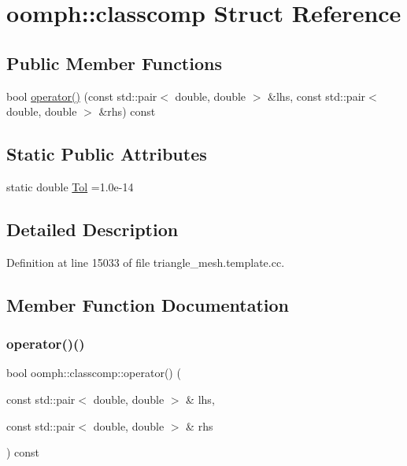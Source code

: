 \hypertarget{structoomph_1_1classcomp}{}\section{oomph\+:\+:classcomp Struct Reference}
\label{structoomph_1_1classcomp}
\subsection*{Public Member Functions}
\begin{DoxyCompactItemize}
\item 
bool \hyperlink{structoomph_1_1classcomp_a88bb6772be3619f5d4d5c7ec782215ae}{operator()} (const std\+::pair$<$ double, double $>$ \&lhs, const std\+::pair$<$ double, double $>$ \&rhs) const
\end{DoxyCompactItemize}
\subsection*{Static Public Attributes}
\begin{DoxyCompactItemize}
\item 
static double \hyperlink{structoomph_1_1classcomp_a383e0604797b23fc66a566f1b278b47b}{Tol} =1.\+0e-\/14
\end{DoxyCompactItemize}


\subsection{Detailed Description}


Definition at line 15033 of file triangle\+\_\+mesh.\+template.\+cc.



\subsection{Member Function Documentation}
\mbox{\label{structoomph_1_1classcomp_a88bb6772be3619f5d4d5c7ec782215ae}} 
\subsubsection{\texorpdfstring{operator()()}{operator()()}}
{\footnotesize\ttfamily bool oomph\+::classcomp\+::operator() (\begin{DoxyParamCaption}\item[{const std\+::pair$<$ double, double $>$ \&}]{lhs,  }\item[{const std\+::pair$<$ double, double $>$ \&}]{rhs }\end{DoxyParamCaption}) const\hspace{0.3cm}{\ttfamily [inline]}}



